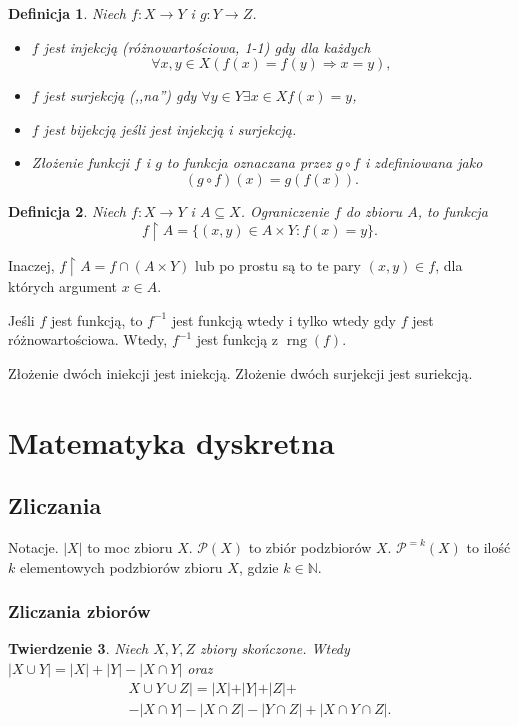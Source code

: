 \documentclass[12pt]{article}
\newcommand{\isfunc}[3]{{{#1}\colon{#2}\rightarrow{#3}}}
\newcommand{\cP}{\mathcal{P}}
\newcommand{\bN}{\mathbb{N}}
\newcommand{\imp}{\Rightarrow}
\newtheorem{thm}{Twierdzenie}
\newtheorem{dfn}[thm]{Definicja}
\DeclareMathOperator{\rng}{rng}
\newcommand{\restricted}{{\upharpoonright}}
\begin{document}
\begin{dfn}
	Niech $\isfunc{f}{X}{Y}$ i $\isfunc{g}{Y}{Z}$.
	\begin{itemize}
		\item $f$ jest injekcją (różnowartościowa, 1-1) gdy
		dla każdych \[\forall x,y \in X (f(x)=f(y)\imp x=y) ,\]
		\item $f$ jest surjekcją (,,na'') gdy 
		$\forall y\in Y\exists x\in X f(x)=y$,
		\item $f$ jest bijekcją jeśli jest injekcją i surjekcją.
		\item 
		Złożenie funkcji $f$ i $g$ to funkcja oznaczana przez
		$g\circ f$ i zdefiniowana jako
		\[
		(g\circ f)(x)= g(f(x)).
		\]
	\end{itemize}
\end{dfn}

\begin{dfn}
	Niech $\isfunc{f}{X}{Y}$ i $A\subseteq X$. 
	Ograniczenie $f$ do zbioru $A$, to funkcja 
	$$
	f\restricted A = \{ (x,y)\in A\times Y \colon f(x) = y\}.
	$$
\end{dfn}
Inaczej, $f\restricted A = f \cap (A\times Y)$ lub po prostu
są to te pary $(x,y)\in f$, dla których argument $x\in A$.


Jeśli $f$ jest funkcją, to $f^{-1}$ jest funkcją wtedy i tylko wtedy
gdy $f$ jest różnowartościowa. Wtedy, $f^{-1}$ jest funkcją z $\rng(f)$.

Złożenie dwóch iniekcji jest iniekcją. Złożenie dwóch surjekcji 
jest suriekcją.
 

\section{Matematyka dyskretna}
\subsection{Zliczania}

Notacje. $|X|$ to moc zbioru $X$.
$\cP(X)$ to zbiór podzbiorów $X$.
$\cP^{=k}(X)$ to ilość $k$ elementowych podzbiorów 
zbioru $X$, gdzie $k\in\bN$.




\subsubsection{Zliczania zbiorów}



\begin{thm}
	Niech $X,Y, Z$ zbiory skończone. Wtedy 
		$|X\cup Y|=|X|+|Y|-|X\cap Y|$ oraz
		 \begin{multline*}
		 	X\cup Y\cup Z|= |X|+|Y|+|Z|+ \\
		 	- |X\cap Y| - |X\cap Z| - |Y\cap Z| + |X\cap Y\cap Z|.
		 \end{multline*} 
\end{thm}
\end{document}
